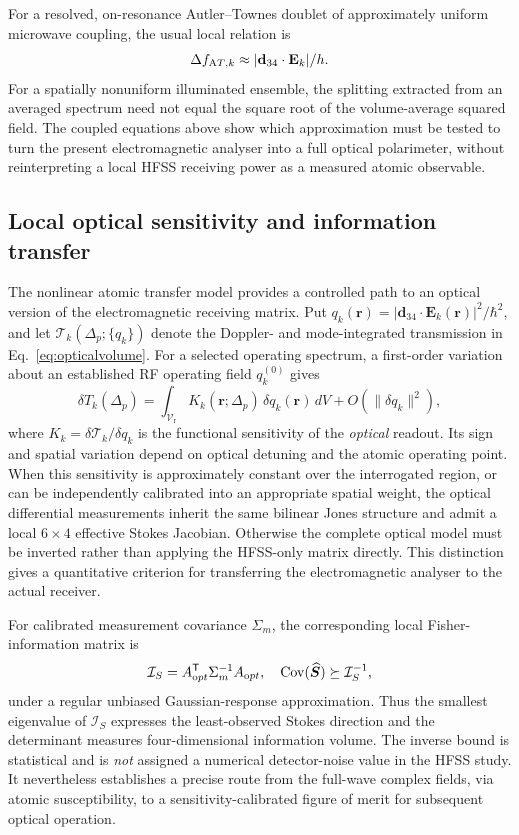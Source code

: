 \documentclass{ieeeaccess}
\newcommand{\Vroi}{\mathcal{V}_{\mathrm r}}
\begin{document}
For a resolved, on-resonance Autler--Townes doublet of approximately uniform microwave coupling, the usual local relation is
\begin{equation}
\Delta f_{{\rm AT},k}\approx |\mathbf d_{34}\cdot\mathbf E_k|/h.
\label{eq:atsplittransfer}
\end{equation}
For a spatially nonuniform illuminated ensemble, the splitting extracted from an averaged spectrum need not equal the square root of the volume-average squared field. The coupled equations above show which approximation must be tested to turn the present electromagnetic analyser into a full optical polarimeter, without reinterpreting a local HFSS receiving power as a measured atomic observable.

\subsection{Local optical sensitivity and information transfer}
The nonlinear atomic transfer model provides a controlled path to an optical version of the electromagnetic receiving matrix. Put $q_k(\mathbf r)=|\mathbf d_{34}\cdot\mathbf E_k(\mathbf r)|^2/\hbar^2$, and let $\mathcal T_k(\Delta_p;\{q_k\})$ denote the Doppler- and mode-integrated transmission in Eq.~\eqref{eq:opticalvolume}. For a selected operating spectrum, a first-order variation about an established RF operating field $q_k^{(0)}$ gives
\begin{equation}
\delta T_k(\Delta_p) =\int_{\Vroi} K_k(\mathbf r;\Delta_p)\,\delta q_k(\mathbf r)\,dV+O(\|\delta q_k\|^2),
\label{eq:optical_kernel}
\end{equation}
where $K_k=\delta\mathcal T_k/\delta q_k$ is the functional sensitivity of the \emph{optical} readout. Its sign and spatial variation depend on optical detuning and the atomic operating point. When this sensitivity is approximately constant over the interrogated region, or can be independently calibrated into an appropriate spatial weight, the optical differential measurements inherit the same bilinear Jones structure and admit a local $6\times4$ effective Stokes Jacobian. Otherwise the complete optical model must be inverted rather than applying the HFSS-only matrix directly. This distinction gives a quantitative criterion for transferring the electromagnetic analyser to the actual receiver.

For calibrated measurement covariance $\Sigma_m$, the corresponding local Fisher-information matrix is
\begin{equation}
\mathcal I_S=A_{\rm opt}^{\mathsf T}\Sigma_m^{-1} A_{\rm opt},\quad
 \mathrm{Cov}(\widehat{\boldsymbol S})\succeq\mathcal I_S^{-1},
\label{eq:fisher}
\end{equation}
under a regular unbiased Gaussian-response approximation. Thus the smallest eigenvalue of $\mathcal I_S$ expresses the least-observed Stokes direction and the determinant measures four-dimensional information volume. The inverse bound is statistical and is \emph{not} assigned a numerical detector-noise value in the HFSS study. It nevertheless establishes a precise route from the full-wave complex fields, via atomic susceptibility, to a sensitivity-calibrated figure of merit for subsequent optical operation.
\end{document}
